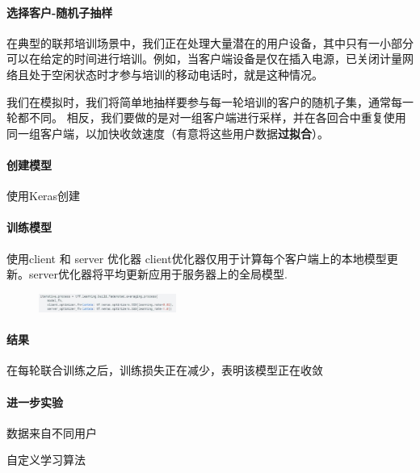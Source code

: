 \paragraph{选择客户-随机子抽样}
在典型的联邦培训场景中，我们正在处理大量潜在的用户设备，其中只有一小部分可以在给定的时间进行培训。例如，当客户端设备是仅在插入电源，已关闭计量网络且处于空闲状态时才参与培训的移动电话时，就是这种情况。

我们在模拟时，我们将简单地抽样要参与每一轮培训的客户的随机子集，通常每一轮都不同。 
相反，我们要做的是对一组客户端进行采样，并在各回合中重复使用同一组客户端，以加快收敛速度​​（有意将这些用户数据\textbf{过拟合}）。 

\paragraph{创建模型}
使用Keras创建

\paragraph{训练模型}
使用client 和 server 优化器
client优化器仅用于计算每个客户端上的本地模型更新。server优化器将平均更新应用于服务器上的全局模型.
 
\begin{figure}[!ht]
    \center
\includegraphics[width=0.4\textwidth]{figures/CDP/fedavgcode.jpg}
\label{fig:fedavgcode}
\end{figure}

\paragraph{结果}

在每轮联合训练之后，训练损失正在减少，表明该模型正在收敛

\paragraph{进一步实验}  

数据来自不同用户

自定义学习算法



